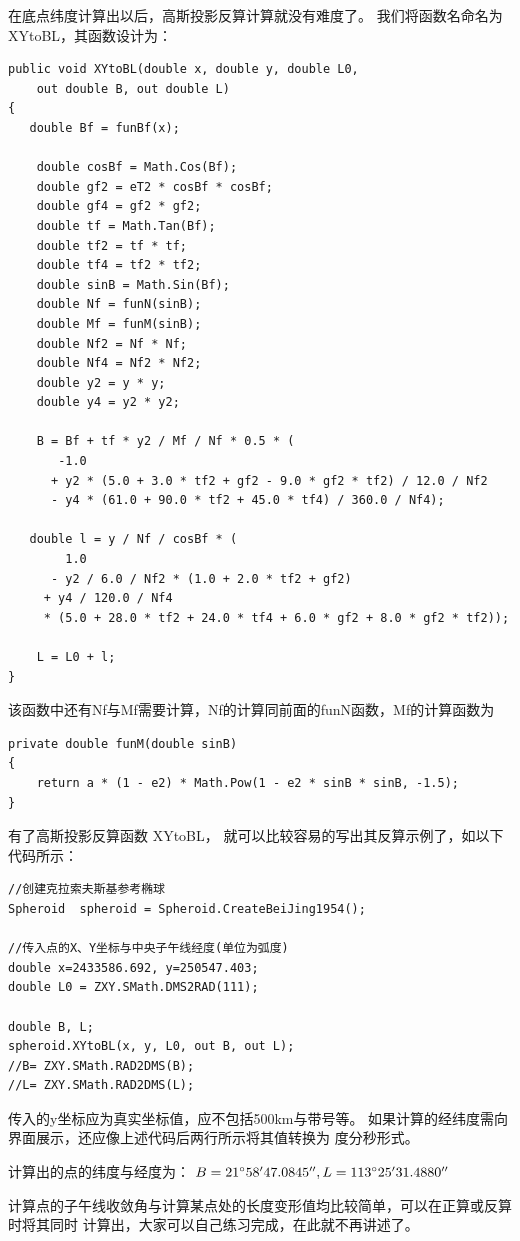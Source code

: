  在底点纬度计算出以后，高斯投影反算计算就没有难度了。
 我们将函数名命名为 XYtoBL，其函数设计为：
 \begin{lstlisting}
public void XYtoBL(double x, double y, double L0,
    out double B, out double L)
{
   double Bf = funBf(x);

    double cosBf = Math.Cos(Bf);
    double gf2 = eT2 * cosBf * cosBf;
    double gf4 = gf2 * gf2;
    double tf = Math.Tan(Bf);
    double tf2 = tf * tf;
    double tf4 = tf2 * tf2;
    double sinB = Math.Sin(Bf);
    double Nf = funN(sinB);
    double Mf = funM(sinB);
    double Nf2 = Nf * Nf;
    double Nf4 = Nf2 * Nf2;
    double y2 = y * y;
    double y4 = y2 * y2;

    B = Bf + tf * y2 / Mf / Nf * 0.5 * (
       -1.0
      + y2 * (5.0 + 3.0 * tf2 + gf2 - 9.0 * gf2 * tf2) / 12.0 / Nf2
      - y4 * (61.0 + 90.0 * tf2 + 45.0 * tf4) / 360.0 / Nf4);

   double l = y / Nf / cosBf * (
        1.0
      - y2 / 6.0 / Nf2 * (1.0 + 2.0 * tf2 + gf2)
     + y4 / 120.0 / Nf4
     * (5.0 + 28.0 * tf2 + 24.0 * tf4 + 6.0 * gf2 + 8.0 * gf2 * tf2));

    L = L0 + l;
}
\end{lstlisting}

该函数中还有Nf与Mf需要计算，Nf的计算同前面的funN函数，Mf的计算函数为
 \begin{lstlisting}
private double funM(double sinB)
{
    return a * (1 - e2) * Math.Pow(1 - e2 * sinB * sinB, -1.5);
}
\end{lstlisting}

 有了高斯投影反算函数 XYtoBL， 就可以比较容易的写出其反算示例了，如以下代码所示：

\begin{lstlisting}
//创建克拉索夫斯基参考椭球
Spheroid  spheroid = Spheroid.CreateBeiJing1954();

//传入点的X、Y坐标与中央子午线经度(单位为弧度)
double x=2433586.692, y=250547.403;
double L0 = ZXY.SMath.DMS2RAD(111);

double B, L;
spheroid.XYtoBL(x, y, L0, out B, out L);
//B= ZXY.SMath.RAD2DMS(B);
//L= ZXY.SMath.RAD2DMS(L);
\end{lstlisting}

传入的y坐标应为真实坐标值，应不包括500km与带号等。
如果计算的经纬度需向界面展示，还应像上述代码后两行所示将其值转换为
度分秒形式。

计算出的点的纬度与经度为：
$B=21 ^\circ 58'47.0845'', L=113^\circ 25'31.4880''$

计算点的子午线收敛角与计算某点处的长度变形值均比较简单，可以在正算或反算时将其同时
计算出，大家可以自己练习完成，在此就不再讲述了。

